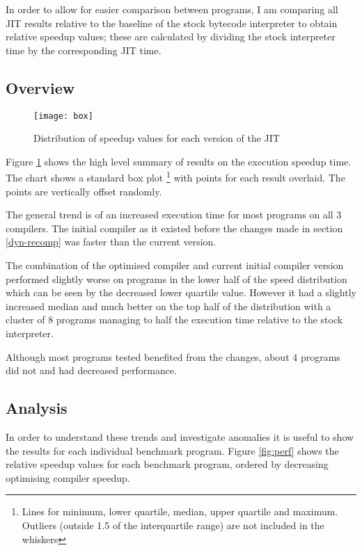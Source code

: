 In order to allow for easier comparison between programs, I am comparing all JIT results relative
to the baseline of the stock bytecode interpreter to obtain relative speedup values; these are
calculated by
dividing the stock interpreter time by the corresponding JIT time.

\subsection{Overview}

\begin{figure}[h]
      \texttt{[image: box]}
      \caption{Distribution of speedup values for each version of the JIT}
      \label{fig:box}
\end{figure}

Figure \ref{fig:box} shows the high level summary of results on the execution speedup time. The
chart shows a standard box plot
\footnote{Lines for minimum, lower quartile, median, upper quartile and maximum. Outliers (outside
      1.5 of the interquartile range) are not included in the whiskers}
with points for each result overlaid. The points are vertically
offset randomly.

The general trend is of an increased execution time for most programs on all 3 compilers. The
initial compiler as it existed before the changes made in section \ref{dyn-recomp} was faster than
the current version.

The combination of the optimised compiler and current initial compiler version performed slightly
worse on programs in the lower half of the speed distribution  which can be seen by the decreased
lower quartile value.  However it had a slightly increased median and much better on the top half
of the distribution with a cluster of 8 programs managing to half the execution time relative to
the stock interpreter.

Although most programs tested benefited from the changes, about 4 programs did not and had
decreased performance.

\subsection{Analysis}

In order to understand these trends and investigate anomalies it is useful to show the results for
each individual benchmark program. Figure \ref{fig:perf} shows the relative speedup values for each
benchmark program, ordered by decreasing optimising compiler speedup.

